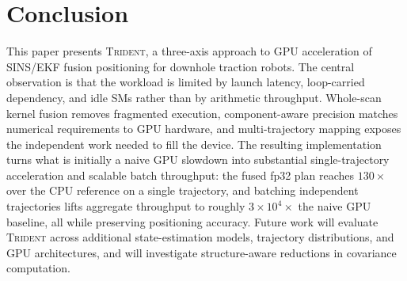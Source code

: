 \section{Conclusion}
\label{sec:conclusion}

This paper presents \textsc{Trident}, a three-axis approach to GPU acceleration of SINS/EKF fusion positioning for downhole traction robots. The central observation is that the workload is limited by launch latency, loop-carried dependency, and idle SMs rather than by arithmetic throughput. Whole-scan kernel fusion removes fragmented execution, component-aware precision matches numerical requirements to GPU hardware, and multi-trajectory mapping exposes the independent work needed to fill the device. The resulting implementation turns what is initially a naive GPU slowdown into substantial single-trajectory acceleration and scalable batch throughput: the fused fp32 plan reaches $130\times$ over the CPU reference on a single trajectory, and batching independent trajectories lifts aggregate throughput to roughly $3\times10^{4}\times$ the naive GPU baseline, all while preserving positioning accuracy. Future work will evaluate \textsc{Trident} across additional state-estimation models, trajectory distributions, and GPU architectures, and will investigate structure-aware reductions in covariance computation.
